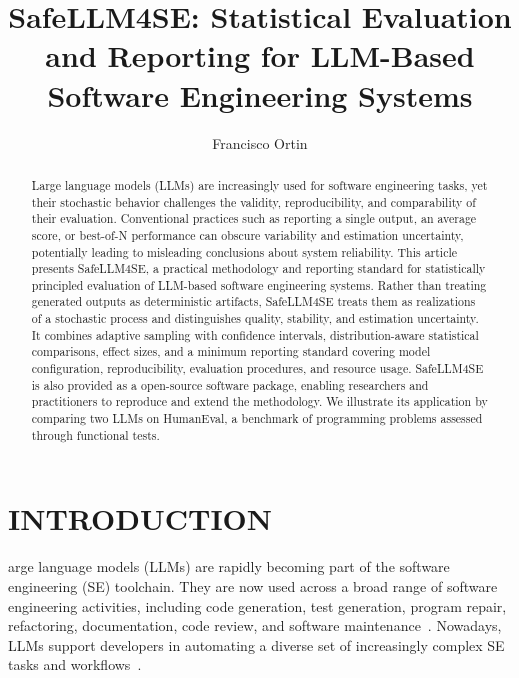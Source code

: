 \documentclass{IEEEcsmag}
\begin{document}
	


\title{SafeLLM4SE: Statistical Evaluation and Reporting for LLM-Based Software Engineering Systems}


\author{Francisco Ortin}



\begin{abstract}
Large language models (LLMs) are increasingly used for software engineering tasks, yet their stochastic behavior challenges the validity, reproducibility, and comparability of their evaluation. Conventional practices such as reporting a single output, an average score, or best-of-N performance can obscure variability and estimation uncertainty, potentially leading to misleading conclusions about system reliability. This article presents SafeLLM4SE, a practical methodology and reporting standard for statistically principled evaluation of LLM-based software engineering systems. Rather than treating generated outputs as deterministic artifacts, SafeLLM4SE treats them as realizations of a stochastic process and distinguishes quality, stability, and estimation uncertainty. It combines adaptive sampling with confidence intervals, distribution-aware statistical comparisons, effect sizes, and a minimum reporting standard covering model configuration, reproducibility, evaluation procedures, and resource usage. SafeLLM4SE is also provided as a open-source software package, enabling researchers and practitioners to reproduce and extend the methodology. We illustrate its application by comparing two LLMs on HumanEval, a benchmark of programming problems assessed through functional tests.
\end{abstract}

\maketitle

\section{INTRODUCTION}
\label{section:introduction}

arge language models (LLMs) are rapidly becoming part of the software engineering (SE) toolchain. They are now used across a broad range of software engineering activities, including code generation, test generation, program repair, refactoring, documentation, code review, and software maintenance~\cite{Hou2024}. Nowadays, LLMs support developers in automating a diverse set of increasingly complex SE tasks and workflows~\cite{Chen2021}.
\end{document}
